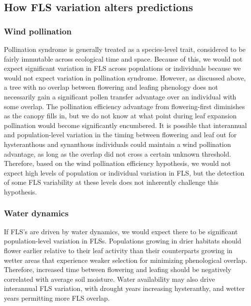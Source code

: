 \documentclass[12pt]{article}\usepackage[]{graphicx}\usepackage[]{color}
\begin{document}
\subsection*{How FLS variation alters predictions}
\subsubsection*{Wind pollination} 
\indent\indent  Pollination syndrome is generally treated as a species-level trait, considered to be fairly immutable across ecological time and space. Because of this, we would not expect significant variation in FLS across populations or individuals because we would not expect variation in pollination syndrome. However, as discussed above, a tree with no overlap between flowering and leafing phenology does not necessarily gain a significant pollen transfer advantage over an individual with some overlap. The pollination efficiency advantage from flowering-first diminishes as the canopy fills in, but  we do not know at what point during leaf expansion pollination would become significantly encumbered. It is possible that interannual and population-level variation in the timing between flowering and leaf out for hysteranthous and synanthous individuals could maintain a wind pollination advantage, as long as the overlap did not cross a certain unknown threshold. Therefore, based on the wind pollination efficiency hypothesis, we would not expect high levels of population or individual variation in FLS, but the detection of some FLS variability at these levels does not inherently challenge this hypothesis.
\subsubsection*{Water dynamics} 
\indent\indent If FLS's are driven by water dynamics, we would expect there to be significant population-level variation in FLSs. Populations growing in drier habitats should flower earlier relative to their leaf activity than their counterparts growing in wetter areas that experience weaker selection for minimizing phenological overlap. Therefore, increased time between flowering and leafing should be negatively correlated with average soil moisture. Water availability may also drive interannual FLS variation, with drought years increasing hysteranthy, and wetter years permitting more FLS overlap. 
\end{document}
